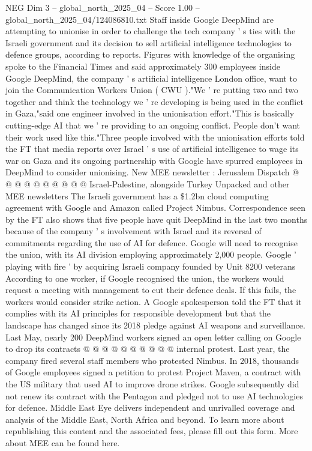 \begin{textsample}{NEG Dim 3 – global\_north\_2025\_04 – Score 1.00 – global\_north\_2025\_04/124086810.txt}  \label{ex:f3_neg_415}
Staff inside Google DeepMind are attempting to unionise in order to challenge the tech company ' s ties with the Israeli government and its decision to sell artificial intelligence technologies to defence groups, according to reports.
Figures with knowledge of the organising spoke to the Financial Times and said approximately 300 employees inside Google DeepMind, the company ' s artificial intelligence London office, want to join the Communication Workers Union ( CWU )."We ' re putting two and two together and think the technology we ' re developing is being used in the conflict in Gaza,"said one engineer involved in the unionisation effort."This is basically cutting-edge AI that we ' re providing to an ongoing conflict.
People don't want their work used like this."Three people involved with the unionisation efforts told the FT that media reports over Israel ' s use of artificial intelligence to wage its war on Gaza and its ongoing partnership with Google have spurred employees in DeepMind to consider unionising.
New MEE newsletter : Jerusalem Dispatch @ @ @ @ @ @ @ @ @ @ Israel-Palestine, alongside Turkey Unpacked and other MEE newsletters The Israeli government has a \$1.2bn cloud computing agreement with Google and Amazon called Project Nimbus.
Correspondence seen by the FT also shows that five people have quit DeepMind in the last two months because of the company ' s involvement with Israel and its reversal of commitments regarding the use of AI for defence.
Google will need to recognise the union, with its AI division employing approximately 2,000 people.
Google ' playing with fire ' by acquiring Israeli company founded by Unit 8200 veterans According to one worker, if Google recognised the union, the workers would request a meeting with management to cut their defence deals.
If this fails, the workers would consider strike action.
A Google spokesperson told the FT that it complies with its AI principles for responsible development but that the landscape has changed since its 2018 pledge against AI weapons and surveillance.
Last May, nearly 200 DeepMind workers signed an open letter calling on Google to drop its contracts @ @ @ @ @ @ @ @ @ @ internal protest.
Last year, the company fired several staff members who protested Nimbus.
In 2018, thousands of Google employees signed a petition to protest Project Maven, a contract with the US military that used AI to improve drone strikes.
Google subsequently did not renew its contract with the Pentagon and pledged not to use AI technologies for defence.
Middle East Eye delivers independent and unrivalled coverage and analysis of the Middle East, North Africa and beyond.
To learn more about republishing this content and the associated fees, please fill out this form.
More about MEE can be found here.

\end{textsample}
